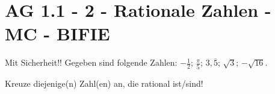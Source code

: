 \section{AG 1.1 - 2 - Rationale Zahlen - MC - BIFIE}

\begin{beispiel}[AG 1.1]{1} %
Mit Sicherheit!!
Gegeben sind folgende Zahlen: $-\frac{1}{2}$; $\frac{\pi}{5}$; $3,\overline{5}$; $\sqrt{3}$; $-\sqrt{16}$.

Kreuze diejenige(n) Zahl(en) an, die rational ist/sind!
\end{beispiel}
